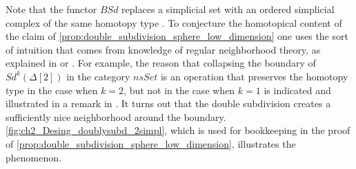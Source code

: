 Note that the functor $BSd$ replaces a simplicial set with an ordered simplicial complex of the same homotopy type \cite[Ex.~3--8, pp.~219--220]{FP90}. To conjecture the homotopical content of the claim of \cref{prop:double_subdivision_sphere_low_dimension} one uses the sort of intuition that comes from knowledge of regular neighborhood theory, as explained in \cite[§3]{RS72} or \cite[§II]{Hu69}. For example, the reason that collapsing the boundary of $Sd^k(\Delta [2])$ in the category $nsSet$ is an operation that preserves the homotopy type in the case when $k=2$, but not in the case when $k=1$ is indicated and illustrated in a remark in \cite[p.~51]{Hu69}. It turns out that the double subdivision creates a sufficiently nice neighborhood around the boundary. \cref{fig:ch2_Desing_doublysubd_2simpl}, which is used for bookkeeping in the proof of \cref{prop:double_subdivision_sphere_low_dimension}, illustrates the phenomenon.  

